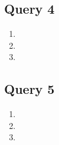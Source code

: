 \documentclass[a4paper,11pt]{article}
\begin{document}
\subsection*{Query 4}
\begin{enumerate}[label=(\alph*)]
    \item
    \item
    \item
\end{enumerate}

\subsection*{Query 5}
\begin{enumerate}[label=(\alph*)]
    \item
    \item
    \item
\end{enumerate}
\end{document}
